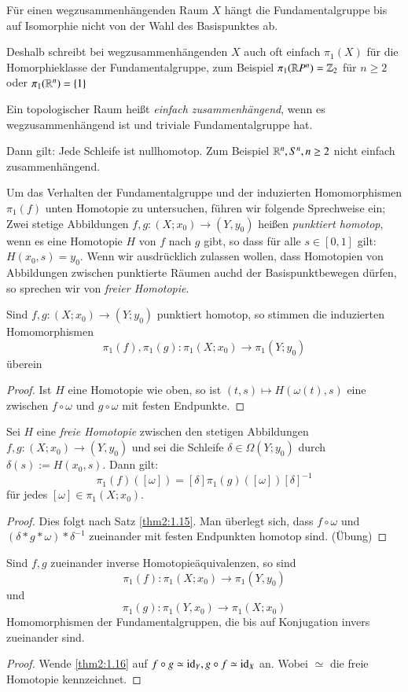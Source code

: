\documentclass[a4paper,10pt]{scrartcl}
\begin{document}
\begin{kor}\label{thm2:1.16}
 Für einen wegzusammenhängenden Raum $X$ hängt die Fundamentalgruppe bis auf Isomorphie nicht von der Wahl des Basispunktes ab.

Deshalb schreibt bei wegzusammenhängenden $X$ auch oft einfach $\pi_1(X)$ für die Homorphieklasse der Fundamentalgruppe, zum Beispiel $\pi_1(\mathbb{R} P^n)=\mathbb{Z}_2$ für $n\ge 2$ oder $\pi_1(\mathbb{R}^n)=\{1\}$
\end{kor}
\begin{df}
 Ein topologischer Raum heißt \emph{einfach zusammenhängend}, wenn es wegzusammenhängend ist und triviale Fundamentalgruppe hat.

Dann gilt: Jede Schleife ist nullhomotop. Zum Beispiel $\mathbb{R}^n, S^n, n\ge 2$ nicht einfach zusammenhängend.  
\end{df}

Um das Verhalten der Fundamentalgruppe und der induzierten Homomorphismen $\pi_1(f)$ unten Homotopie zu untersuchen, führen wir folgende Sprechweise ein; Zwei stetige Abbildungen $f,g: (X;x_0)\to (Y,y_0)$ heißen \emph{punktiert homotop}, wenn es eine Homotopie $H$ von $f$ nach $g$ gibt, so dass für alle $s\in [0,1]$ gilt: $H(x_0, s)=y_0$. Wenn wir ausdrücklich zulassen wollen, dass Homotopien von Abbildungen zwischen punktierte Räumen auchd der Basispunktbewegen dürfen, so sprechen wir von \emph{freier Homotopie}.

\begin{st}
 Sind $f,g: (X;x_0)\to (Y;y_0)$ punktiert homotop, so stimmen die induzierten Homomorphismen
\[
 \pi_1(f), \pi_1(g): \pi_1(X;x_0)\to \pi_1(Y;y_0)
\]
überein
\end{st}
\begin{proof}
 Ist $H$ eine Homotopie wie oben, so ist $(t,s)\mapsto H(\omega(t), s)$ eine zwischen $f\circ \omega$ und $g\circ \omega$ mit festen Endpunkte.
\end{proof}

\begin{st}
 Sei $H$ eine \emph{freie Homotopie} zwischen den stetigen Abbildungen $f,g: (X;x_0)\to (Y,y_0)$ und sei die Schleife $\delta\in \Omega(Y;y_0)$ durch $\delta(s):=H(x_0, s)$. Dann gilt:
\[
 \pi_1(f)([\omega])=[\delta]\pi_1(g)([\omega]){[\delta]}^{-1}
\]
für jedes $[\omega]\in \pi_1(X;x_0)$.
\end{st}

\begin{proof}
 Dies folgt nach Satz \ref{thm2:1.15}. Man überlegt sich, dass $f\circ \omega$ und $(\delta*g*\omega)*\delta^{-1}$ zueinander mit festen Endpunkten homotop sind. (Übung)
\end{proof}
\begin{kor}
 Sind $f,g$ zueinander inverse Homotopieäquivalenzen, so sind
\[
\pi_1(f):\pi_1(X;x_0)\to \pi_1(Y,y_0)
\]
und
\[
 \pi_1(g):\pi_1(Y,x_0)\to \pi_1(X;x_0)
\]
Homomorphismen der Fundamentalgruppen, die bis auf Konjugation invers zueinander sind. 
\end{kor}
\begin{proof}
 Wende \ref{thm2:1.16} auf $f\circ g \simeq \operatorname{id}_Y, g\circ f \simeq \operatorname{id}_X$ an.  Wobei $\simeq$ die freie Homotopie kennzeichnet.
\end{proof}
\end{document}
